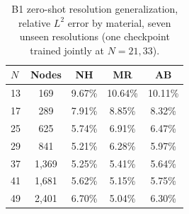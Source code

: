 \documentclass[final,5p,times]{elsarticle}
\begin{document}
\begin{table}[h]
\centering
\caption{B1 zero-shot resolution generalization, relative $L^2$ error by
  material, seven unseen resolutions (one checkpoint trained jointly at
  $N{=}21,33$).}
\label{tab:b1-zeroshot}
\small
\begin{tabular}{lcccc}
\toprule
$N$ & Nodes & NH & MR & AB \\
\midrule
13 & 169   & 9.67\% & 10.64\% & 10.11\% \\
17 & 289   & 7.91\% & 8.85\%  & 8.32\%  \\
25 & 625   & 5.74\% & 6.91\%  & 6.47\%  \\
29 & 841   & 5.21\% & 6.28\%  & 5.97\%  \\
37 & 1{,}369 & 5.25\% & 5.41\% & 5.64\% \\
41 & 1{,}681 & 5.62\% & 5.15\% & 5.75\% \\
49 & 2{,}401 & 6.70\% & 5.04\% & 6.30\% \\
\bottomrule
\end{tabular}
\end{table}
\end{document}
